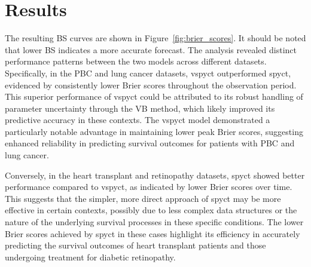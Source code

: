 \documentclass[3p,review,authoryear]{elsarticle}
\begin{document}
\section{Results}

The resulting BS curves are shown in Figure~\ref{fig:brier_scores}.
It should be noted that lower BS indicates a more accurate forecast.
The analysis revealed distinct performance patterns between the two models across different datasets.
Specifically, in the PBC and lung cancer datasets, \gls{vspyct} outperformed \gls{spyct}, evidenced by consistently lower Brier scores throughout the observation period.
This superior performance of \gls{vspyct} could be attributed to its robust handling of parameter uncertainty through the VB method, which likely improved its predictive accuracy in these contexts.
The \gls{vspyct} model demonstrated a particularly notable advantage in maintaining lower peak Brier scores, suggesting enhanced reliability in predicting survival outcomes for patients with PBC and lung cancer.

Conversely, in the heart transplant and retinopathy datasets, \gls{spyct} showed better performance compared to \gls{vspyct}, as indicated by lower Brier scores over time.
This suggests that the simpler, more direct approach of \gls{spyct} may be more effective in certain contexts, possibly due to less complex data structures or the nature of the underlying survival processes in these specific conditions.
The lower Brier scores achieved by \gls{spyct} in these cases highlight its efficiency in accurately predicting the survival outcomes of heart transplant patients and those undergoing treatment for diabetic retinopathy.


\end{document}
